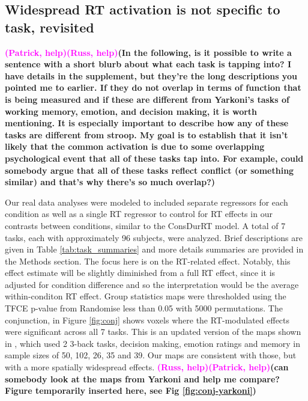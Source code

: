 \documentclass[titlepage,12pt] {article}
\newcommand{\rh}{\textcolor{magenta}{\textbf{(Russ, help)}}}
\newcommand{\ph}{\textcolor{magenta}{\textbf{(Patrick, help)}}}
\begin{document}
\subsection*{Widespread RT activation is not specific to task, revisited}

\ph\rh\textbf{(In the following, is it possible to write a sentence with a short blurb about what each task is tapping into?  I have details in the supplement, but they're the long descriptions you pointed me to earlier.  If they do not overlap in terms of function that is being measured and if these are different from Yarkoni's tasks of working memory, emotion, and decision making, it is worth mentioning.  It is especially important to describe how any of these tasks are different from stroop.  My goal is to establish that it isn't likely that the common activation is due to some overlapping psychological event that all of these tasks tap into.  For example, could somebody argue that all of these tasks reflect conflict (or something similar) and that's why there's so much overlap?)} 

Our real data analyses were modeled to included separate regressors for each condition as well as a single RT regressor to control for RT effects in our contrasts between conditions, similar to the ConsDurRT model.  A total of 7 tasks, each with approximately 96 subjects, were analyzed.  Brief descriptions are given in Table \ref{tab:task_summaries} and more details summaries are provided in the Methods section.   The focus here is on the RT-related effect.  Notably, this effect estimate will be slightly diminished from a full RT effect, since it is adjusted for condition difference and so the interpretation would be the average within-conditon RT effect. Group statistics maps were thresholded using the TFCE p-value from Randomise less than 0.05 with 5000 permutations.  The conjunction, in Figure \ref{fig:conj} shows voxels where the RT-modulated effects were significant across all 7 tasks.  This is an updated version of the maps shown in \citet{yarkoni_bold_2009}, which used 2 3-back tasks, decision making, emotion ratings and memory in sample sizes of 50, 102, 26, 35 and 39.  Our maps are consistent with those, but with a more spatially widespread effects. \rh \ph\textbf{(can somebody look at the maps from Yarkoni and help me compare?  Figure temporarily inserted here, see Fig \ref{fig:conj-yarkoni})}
\end{document}

